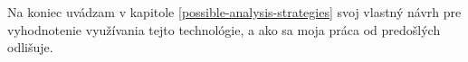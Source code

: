Na koniec uvádzam v kapitole 
\ref{possible-analysis-strategies} svoj vlastný návrh pre vyhodnotenie využívania tejto technológie, a ako sa moja práca od predošlých odlišuje. 


